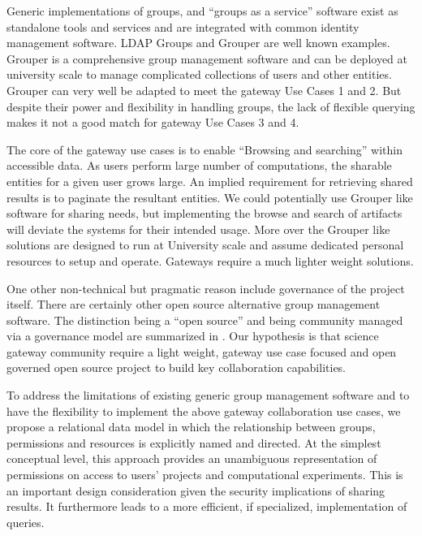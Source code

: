\documentclass[sigconf]{acmart}
\begin{document}
Generic implementations of groups, and ``groups as a service'' software exist as standalone tools and services and are integrated with common identity management software. LDAP Groups \cite{aclLDAP} and Grouper \cite{grouperWebsite} are well known examples. Grouper is a comprehensive group management software and can be deployed at university scale to manage complicated collections of users and other entities. Grouper can very well be adapted to meet the gateway Use Cases 1 and 2. But despite their power and flexibility in handling groups, the lack of flexible querying makes it not a good match for gateway Use Cases 3 and 4.

The core of the gateway use cases is to enable ``Browsing and searching'' within accessible data. As users perform large number of computations, the sharable entities for a given user grows large. An implied requirement for retrieving shared results is to paginate the resultant entities. We could potentially use Grouper like software for sharing needs, but implementing the browse and search of artifacts will deviate the systems for their intended usage. More over the Grouper like solutions are designed to run at University scale and assume dedicated personal resources to setup and operate. Gateways require a much lighter weight solutions. 

One other non-technical but pragmatic reason include governance of the project itself. There are certainly other open source alternative group management software. The distinction being a ``open source'' and being community managed via a governance model are summarized in \cite{o2007governance}. Our hypothesis is that science gateway community require a light weight, gateway use case focused and open governed open source project to build  key collaboration capabilities. 

To address the limitations of existing generic group management software and to have the flexibility to implement the above gateway collaboration use cases, we propose a relational data model in which the relationship between groups, permissions and resources is explicitly named and directed. At the simplest conceptual level, this approach provides an unambiguous representation of permissions on access to users' projects and computational experiments. This is an important design consideration given the security implications of sharing results. It furthermore leads to a more efficient, if specialized, implementation of queries.
\end{document}
